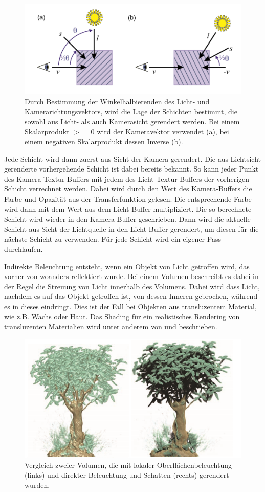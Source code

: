 \begin{figure}[!htb]
	\centering
	\includegraphics[width=0.7\linewidth]{images/halfAngleSlice.png}
	\caption{Durch Bestimmung der Winkelhalbierenden des Licht- und Kamerarichtungsvektors, wird die Lage der Schichten bestimmt, die sowohl aus Licht- als auch Kamerasicht gerendert werden. Bei einem Skalarprodukt $>=0$ wird der Kameravektor verwendet (a), bei einem negativen Skalarprodukt dessen Inverse (b).}
	\label{img:halfAngleSlice}
\end{figure}
\FloatBarrier

Jede Schicht wird dann zuerst aus Sicht der Kamera gerendert. Die aus Lichtsicht gerenderte vorhergehende Schicht ist dabei bereits bekannt. So kann jeder Punkt des Kamera-Textur-Buffers mit jedem des Licht-Textur-Buffers der vorherigen Schicht verrechnet werden. Dabei wird durch den Wert des Kamera-Buffers die Farbe und Opazität aus der Transferfunktion gelesen. Die entsprechende Farbe wird dann mit dem Wert aus dem Licht-Buffer multipliziert. Die so berechnete Schicht wird wieder in den Kamera-Buffer geschrieben. Dann wird die aktuelle Schicht aus Sicht der Lichtquelle in den Licht-Buffer gerendert, um diesen für die nächste Schicht zu verwenden.
Für jede Schicht wird ein eigener Pass durchlaufen.

Indirekte Beleuchtung entsteht, wenn ein Objekt von Licht getroffen wird, das vorher von woanders reflektiert wurde. Bei einem Volumen beschreibt es dabei in der Regel die Streuung von Licht innerhalb des Volumens. Dabei wird dass Licht, nachdem es auf das Objekt getroffen ist, von dessen Inneren gebrochen, während es in dieses eindringt. Dies ist der Fall bei Objekten aus transluzentem Material, wie z.B. Wachs oder Haut.
Das Shading für ein realistisches Rendering von transluzenten Materialien wird unter anderem von \cite{hansen02} und \cite{Hadwiger06} beschrieben.

\begin{figure}[!htb]
	\centering
	\includegraphics[width=0.7\linewidth]{images/localGlobalIllumination.png}
	\caption{Vergleich zweier Volumen, die mit lokaler Oberflächenbeleuchtung (links) und direkter Beleuchtung und Schatten (rechts) gerendert wurden.}
	\label{img:localGlobalIll}
\end{figure}
\FloatBarrier

